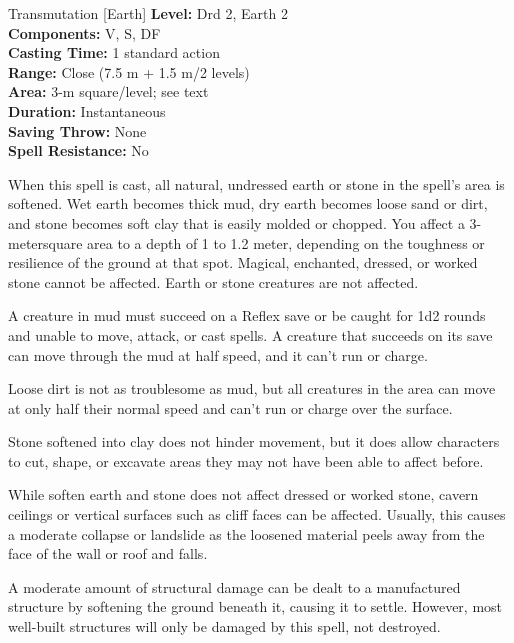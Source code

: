{Transmutation [Earth]}
{
	\textbf{Level:}
	Drd 2, Earth 2\\
	\textbf{Components:}
	V, S, DF\\
	\textbf{Casting Time:}
	1 standard action\\
	\textbf{Range:}
	Close (7.5 m + 1.5 m/2 levels)\\
	\textbf{Area:}
	3-m square/level; see text\\
	\textbf{Duration:}
	Instantaneous\\
	\textbf{Saving Throw:}
	None\\
	\textbf{Spell Resistance:}
	No\\
}
{
	When this spell is cast, all natural, undressed earth or stone in the spell's area is softened. Wet earth becomes thick mud, dry earth becomes loose sand or dirt, and stone becomes soft clay that is easily molded or chopped. You affect a 3-metersquare area to a depth of 1 to 1.2 meter, depending on the toughness or resilience of the ground at that spot. Magical, enchanted, dressed, or worked stone cannot be affected. Earth or stone creatures are not affected.

	A creature in mud must succeed on a Reflex save or be caught for 1d2 rounds and unable to move, attack, or cast spells. A creature that succeeds on its save can move through the mud at half speed, and it can't run or charge.

	Loose dirt is not as troublesome as mud, but all creatures in the area can move at only half their normal speed and can't run or charge over the surface.

	Stone softened into clay does not hinder movement, but it does allow characters to cut, shape, or excavate areas they may not have been able to affect before.

	While soften earth and stone does not affect dressed or worked stone, cavern ceilings or vertical surfaces such as cliff faces can be affected. Usually, this causes a moderate collapse or landslide as the loosened material peels away from the face of the wall or roof and falls.

	A moderate amount of structural damage can be dealt to a manufactured structure by softening the ground beneath it, causing it to settle. However, most well-built structures will only be damaged by this spell, not destroyed.

}
